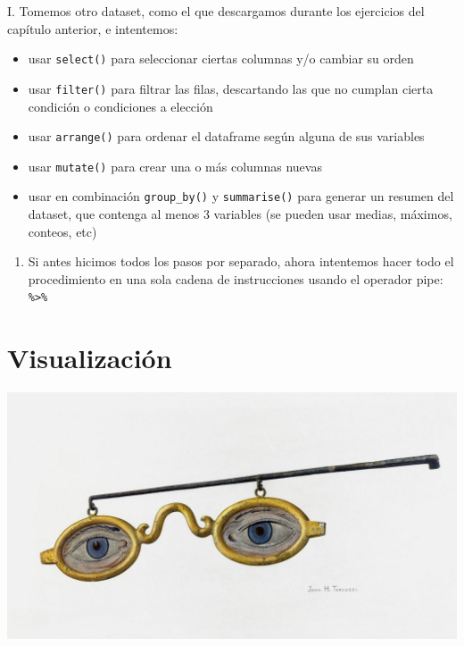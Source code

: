 \documentclass[
]{book}
\providecommand{\tightlist}{%
  \setlength{\itemsep}{0pt}\setlength{\parskip}{0pt}}
\begin{document}
I. Tomemos otro dataset, como el que descargamos durante los ejercicios del capítulo anterior, e intentemos:

\begin{itemize}
\tightlist
\item
  usar \texttt{select()} para seleccionar ciertas columnas y/o cambiar su orden
\item
  usar \texttt{filter()} para filtrar las filas, descartando las que no cumplan cierta condición o condiciones a elección
\item
  usar \texttt{arrange()} para ordenar el dataframe según alguna de sus variables
\item
  usar \texttt{mutate()} para crear una o más columnas nuevas
\item
  usar en combinación \texttt{group\_by()} y \texttt{summarise()} para generar un resumen del dataset, que contenga al menos 3 variables (se pueden usar medias, máximos, conteos, etc)
\end{itemize}

\begin{enumerate}
\def\labelenumi{\Roman{enumi}.}
\setcounter{enumi}{1}
\tightlist
\item
  Si antes hicimos todos los pasos por separado, ahora intentemos hacer todo el procedimiento en una sola cadena de instrucciones usando el operador pipe: \texttt{\%\textgreater{}\%}
\end{enumerate}

\hypertarget{visualizaciuxf3n}{%
\chapter{Visualización}\label{visualizaciuxf3n}}

\includegraphics[width=1\linewidth]{imagenes/visualizacion}
\end{document}
